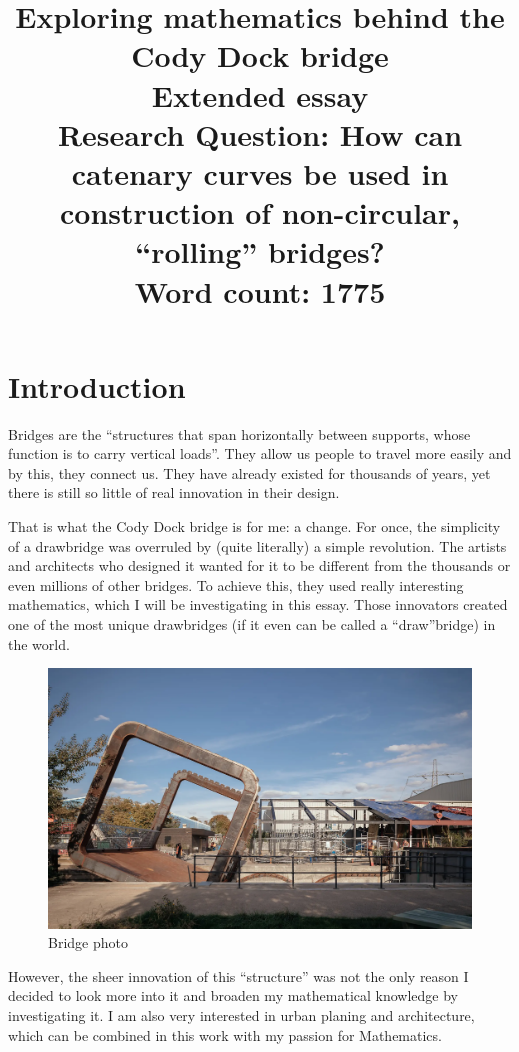 \documentclass[12pt]{article}
\title{Exploring mathematics behind the Cody Dock bridge \\
    \large Extended essay \\
    \normalsize Research Question: How can catenary curves be used in construction of non-circular, ``rolling'' bridges? \\
    \vspace{12pt} Word count: 1775}
\date{}
\author{}
\begin{document}
    \maketitle
    \vspace{4pt}
    \tableofcontents
    \newpage
    
    \section{Introduction}

        Bridges are the ``structures that span horizontally between supports, whose function is to carry vertical loads''\cite{bridge_encyplopedia}. They allow us people to travel more easily and by this, they connect us. They have already existed for thousands of years, yet there is still so little of real innovation in their design.
    
        That is what the Cody Dock bridge is for me: a change. For once, the simplicity of a drawbridge was overruled by (quite literally) a simple revolution. The artists and architects who designed it wanted for it to be different from the thousands or even millions of other bridges. To achieve this, they used really interesting mathematics, which I will be investigating in this essay. Those innovators created one of the most unique drawbridges (if it even can be called a ``draw''bridge) in the world.

        \begin{figure}[H]
            \centering
            \includegraphics[width=0.75\linewidth]{images/bridge.png}
            \caption[Bridge photo]{Bridge photo\footnotemark}\label{fig:bridge_photo}
        \end{figure}

        However, the sheer innovation of this ``structure'' was not the only reason I decided to look more into it and broaden my mathematical knowledge by investigating it. I am also very interested in urban planing and architecture, which can be combined in this work with my passion for Mathematics.
\end{document}
